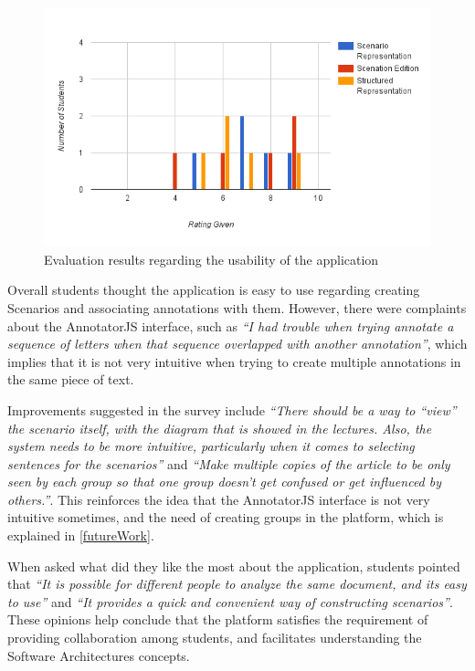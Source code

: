 \documentclass[conference]{IEEEtran}
\begin{document}
\begin{figure}[h]
\includegraphics[scale=0.4]{images/graph2}
\caption{Evaluation results regarding the usability of the application}
\label{figure:usabilityEvaluation}
\end{figure}

Overall students thought the application is easy to use regarding creating Scenarios and associating annotations with them. However, there were complaints about the AnnotatorJS interface, such as \textit{``I had trouble when trying annotate a sequence of letters when that sequence overlapped with another annotation''}, which implies that it is not very intuitive when trying to create multiple annotations in the same piece of text.

Improvements suggested in the survey include \textit{``There should be a way to ``view'' the scenario itself, with the diagram that is showed in the lectures. Also, the system needs to be more intuitive, particularly when it comes to selecting sentences for the scenarios''} and \textit{``Make multiple copies of the article to be only seen by each group so that one group doesn't get confused or get influenced by others.''}. This reinforces the idea that the AnnotatorJS interface is not very intuitive sometimes, and the need of creating groups in the platform, which is explained in \ref{futureWork}.

When asked what did they like the most about the application, students pointed that \textit{``It is possible for different people to analyze the same document, and its easy to use''} and \textit{``It provides a quick and convenient way of constructing scenarios''}. These opinions help conclude that the platform satisfies the requirement of providing collaboration among students, and facilitates understanding the Software Architectures concepts.
\end{document}
